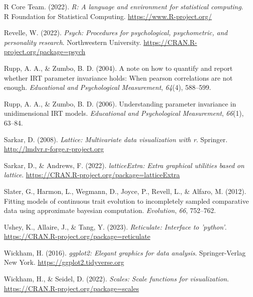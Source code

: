 \documentclass[
  man]{apa6}
\newlength{\cslhangindent}
\newlength{\cslentryspacingunit} %
\newenvironment{CSLReferences}[2] %
 {%
  \setlength{\parindent}{0pt}
  \ifodd #1
  \let\oldpar\par
  \def\par{\hangindent=\cslhangindent\oldpar}
  \fi
  \setlength{\parskip}{#2\cslentryspacingunit}
 }%
 {}
\begin{document}
\begin{CSLReferences}{1}{0}
\leavevmode{}%
R Core Team. (2022). \emph{R: A language and environment for statistical computing}. R Foundation for Statistical Computing. \url{https://www.R-project.org/}

\leavevmode{}%
Revelle, W. (2022). \emph{Psych: Procedures for psychological, psychometric, and personality research}. Northwestern University. \url{https://CRAN.R-project.org/package=psych}

\leavevmode{}%
Rupp, A. A., \& Zumbo, B. D. (2004). A note on how to quantify and report whether IRT parameter invariance holds: When pearson correlations are not enough. \emph{Educational and Psychological Measurement}, \emph{64}(4), 588--599.

\leavevmode{}%
Rupp, A. A., \& Zumbo, B. D. (2006). Understanding parameter invariance in unidimensional IRT models. \emph{Educational and Psychological Measurement}, \emph{66}(1), 63--84.

\leavevmode{}%
Sarkar, D. (2008). \emph{Lattice: Multivariate data visualization with r}. Springer. \url{http://lmdvr.r-forge.r-project.org}

\leavevmode{}%
Sarkar, D., \& Andrews, F. (2022). \emph{latticeExtra: Extra graphical utilities based on lattice}. \url{https://CRAN.R-project.org/package=latticeExtra}

\leavevmode{}%
Slater, G., Harmon, L., Wegmann, D., Joyce, P., Revell, L., \& Alfaro, M. (2012). Fitting models of continuous trait evolution to incompletely sampled comparative data using approximate bayesian computation. \emph{Evolution}, \emph{66}, 752--762.

\leavevmode{}%
Ushey, K., Allaire, J., \& Tang, Y. (2023). \emph{Reticulate: Interface to 'python'}. \url{https://CRAN.R-project.org/package=reticulate}

\leavevmode{}%
Wickham, H. (2016). \emph{ggplot2: Elegant graphics for data analysis}. Springer-Verlag New York. \url{https://ggplot2.tidyverse.org}

\leavevmode{}%
Wickham, H., \& Seidel, D. (2022). \emph{Scales: Scale functions for visualization}. \url{https://CRAN.R-project.org/package=scales}

\end{CSLReferences}
\end{document}
